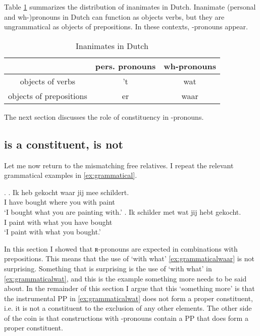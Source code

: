\documentclass{article}
\begin{document}
Table \ref{tbl:inanimates} summarizes the distribution of inanimates in Dutch. Inanimate (personal and wh-)pronouns in Dutch can function as objects verbs, but they are ungrammatical as objects of prepositions. In these contexts, -pronouns appear.

\begin{table}[ht]
	\center
	\caption {Inanimates in Dutch}
	\begin{minipage}{0.7\linewidth}
		\begin{tabularx}{\textwidth}{ccc}
		\toprule
                        & pers. pronouns & wh-pronouns \\
  	\midrule
objects of verbs        & 't             & wat         \\
objects of prepositions & er             & waar        \\
\bottomrule
\end{tabularx}
\label{tbl:inanimates}
\end{minipage}
\end{table}

The next section discusses the role of constituency in -pronouns.


\subsection{ is a constituent,  is not}

Let me now return to the mismatching free relatives. I repeat the relevant grammatical examples in \ref{ex:grammatical}.

\ex.\label{ex:grammatical}
\ag. Ik heb gekocht waar jij mee schildert.\\
 I have bought where you with paint\\
 `I bought what you are painting with.'\label{ex:grammaticalwaar}
\bg. Ik schilder met wat jij hebt gekocht.\\
 I paint with what you have bought\\
 `I paint with what you bought.'\label{ex:grammaticalwat}

In this section I showed that ʀ-pronouns are expected in combinations with prepositions. This means that the use of  `with what' \ref{ex:grammaticalwaar} is not surprising. Something that is surprising is the use of  `with what' in \ref{ex:grammaticalwat}, and this is the example something more needs to be said about. In the remainder of this section I argue that this `something more' is that the instrumental PP in \ref{ex:grammaticalwat} does not form a proper constituent, i.e. it is not a constituent to the exclusion of any other elements. The other side of the coin is that constructions with -pronouns contain a PP that does form a proper constituent.
\end{document}

